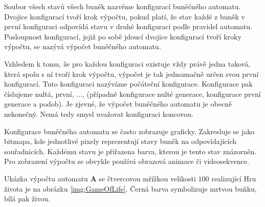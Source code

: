 Soubor všech stavů všech buněk nazvěme konfigurací buněčného automatu. Dvojice konfigurací tvoří krok výpočtu, pokud platí, že stav každé z buněk v první konfiguraci odpovídá stavu v druhé konfiguraci podle pravidel automatu. Posloupnost konfigurací, jejiž po sobě jdoucí dvojice konfigurací tvoří kroky výpočtu, se nazývá výpočet buněčného automatu.

Vzhledem k tomu, že pro každou konfiguraci existuje vždy právě jedna taková, která spolu s ní tvoří krok výpočtu, výpočet je tak jednoznačně určen svou první konfigurací. Tuto konfiguraci nazýváme počáteční konfigurace. Konfigurace pak číslujeme nultá, první, $\dots$, (případně konfigurace nulté generace, konfigurace první generace a podob). Je zjevné, že výpočet buněčného automatu je obecně nekonečný. Nemá tedy smysl uvažovat konfiguraci koncovou.

Konfigurace buněčného automatu se často zobrazuje graficky. Zakresluje se jako bitmapa, kde jednotlivé pixely reprezentují stavy buněk na odpovídajících souřadnicích. Každému stavu je přiřazena barva, kterou je tento stav znázorněn. Pro zobrazení výpočtu se obvykle používá obrazová animace či videosekvence.

\begin{example}
  Ukázka výpočtu automatu $\mathbf{A}$ se čtvercovou mřížkou velikosti $100$ realizující Hru života je na obrázku \ref{img:GameOfLife}. Černá barva symbolizuje mrtvou buňku, bílá pak živou. 
\end{example}

